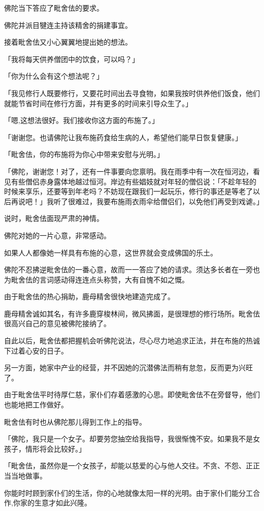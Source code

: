 \documentclass[twoside,openany]{book}
\begin{document}
佛陀当下答应了毗舍佉的要求。

佛陀并派目犍连主持该精舍的捐建事宜。

接着毗舍佉又小心翼翼地提出她的想法。

「我将每天供养僧团中的饮食，可以吗？」

「你为什么会有这个想法呢？」

「我见修行人既要修行，又要花时间出去寻食物，如果我按时供养他们饭食，他们就能节省时间在修行方面，并有更多的时间来引导众生了。」

「嗯,这想法很好。我们接收你这方面的布施了。」

「谢谢您。也请佛陀让我布施药食给生病的人，希望他们能早日恢复健康。」

「毗舍佉，你的布施将为你心中带来安慰与光明。」

「佛陀，谢谢您！对了，还有一件事要向您禀明。我在雨季中有一次在恒河边，看见有些僧侣赤身露体地越过恒河。岸边有些娼妓就对年轻的僧侣说：「不趁年轻的时候来享乐，还要等到年老吗？不妨现在跟我们一起玩乐，修行的事还是等老了以后再说吧！」我听了很难过，我要布施雨衣雨伞给僧侣们，以免他们再受到戏谑。」

说时，毗舍佉面现严肃的神情。

佛陀对她的一片心意，非常感动。

如果人人都像她一样具有布施的心意，这世界就会变成佛国的乐土。

佛陀不忍拂逆毗舍佉的一番心意，故而一一答应了她的请求。须达多长者在一旁也为毗舍佉的言词感动得连连点头称赞，大有自愧不如之慨。

由于毗舍佉的热心捐助，鹿母精舍很快地建造完成了。

鹿母精舍诚如其名，有许多鹿穿梭林间，微风拂面，是很理想的修行场所。毗舍佉很高兴自己的意见被佛陀接纳了。

自此以后，毗舍佉都把握机会听佛陀说法，尽心尽力地追求正法，并在布施的热诚下过着心安的日子。

另一方面，她家中产业的经营，并不因她的沉潜佛法而稍有怠忽，反而更为兴旺了。

由于毗舍佉平时待厚仁慈，家仆们存着感激的心思。即使毗舍佉不在旁督导，他们也能地把工作做好。

毗舍佉有时也从佛陀那儿得到工作上的指导。

「佛陀，我只是一个女子。却要劳您抽空给我指导，我很惭愧不安。如果我不是女孩子，情形将会比较好。」

「毗舍佉，虽然你是一个女孩子，却能以慈爱的心与他人交往。不贪、不怨、正正当当地做事。

你能时时顾到家仆们的生活，你的心地就像太阳一样的光明。由于家仆们能分工合作,你家的生意才如此兴隆。
\end{document}

